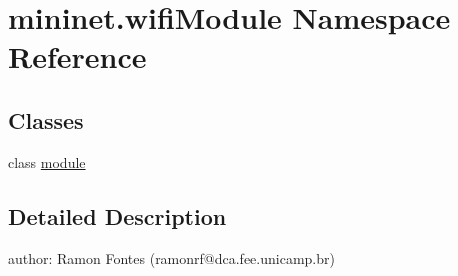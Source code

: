 \hypertarget{namespacemininet_1_1wifiModule}{\section{mininet.\-wifi\-Module Namespace Reference}
\label{namespacemininet_1_1wifiModule}
}
\subsection*{Classes}
\begin{DoxyCompactItemize}
\item 
class \hyperlink{classmininet_1_1wifiModule_1_1module}{module}
\end{DoxyCompactItemize}


\subsection{Detailed Description}
\begin{DoxyVerb}author: Ramon Fontes (ramonrf@dca.fee.unicamp.br)
\end{DoxyVerb}
 